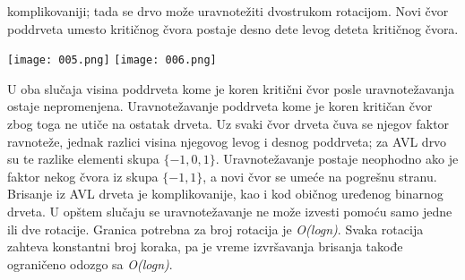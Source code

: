 \documentclass{article}
\begin{document}
komplikovaniji; tada se drvo može uravnotežiti dvostrukom rotacijom. Novi čvor poddrveta umesto kritičnog čvora
postaje desno dete levog deteta kritičnog čvora. 
\begin{center}
   \texttt{[image: 005.png]}
   \texttt{[image: 006.png]}
\end{center}
\vspace{0.5cm}
U oba slučaja visina poddrveta kome je koren kritični čvor posle
uravnotežavanja ostaje nepromenjena. Uravnotežavanje poddrveta kome je koren
kritičan čvor zbog toga ne utiče na ostatak drveta. Uz svaki čvor drveta čuva se
njegov faktor ravnoteže, jednak razlici visina njegovog levog i desnog poddrveta;
za AVL drvo su te razlike elementi skupa $\{-1, 0, 1\}$. Uravnotežavanje postaje
neophodno ako je faktor nekog čvora iz skupa $\{-1, 1\}$, a novi čvor se umeće na
pogrešnu stranu.
Brisanje iz AVL drveta je komplikovanije, kao i kod običnog uređenog binarnog
drveta. U opštem slučaju se uravnotežavanje ne može izvesti pomoću samo
jedne ili dve rotacije. Granica potrebna za broj rotacija je
\textit{O(logn)}. Svaka rotacija zahteva konstantni broj koraka, pa je vreme izvršavanja brisanja takođe ograničeno odozgo sa \textit{O(logn)}.
\end{document}
